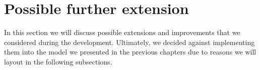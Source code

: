 \documentclass[\relativeRoot/main.tex]{subfiles}
\begin{document}
\chapter{Possible further extension}
\label{chap:extensions}

In this section we will discuss possible extensions and improvements that we considered during the development. Ultimately, we decided against implementing them into the model we presented in the previous chapters due to reasons we will layout in the following subsections.


\end{document}
